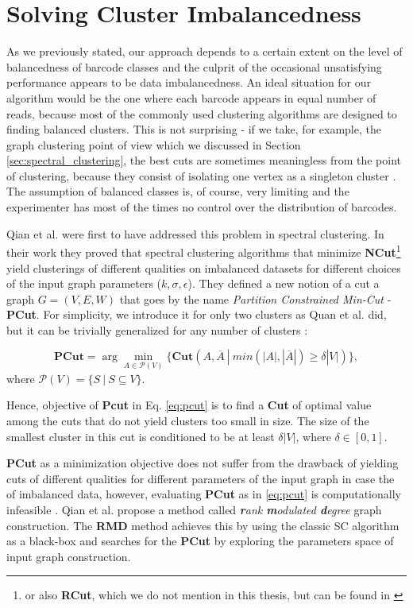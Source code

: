\section{Solving Cluster Imbalancedness}
As we previously stated, our approach depends to a certain extent on the level of balancedness of barcode classes and the culprit of the occasional unsatisfying performance appears to be data imbalancedness. An ideal situation for our algorithm would be the one where each barcode appears in equal number of reads, because most of the commonly used clustering algorithms are designed to finding balanced clusters. This is not surprising - if we take, for example, the graph clustering point of view which we discussed in Section \ref{sec:spectral_clustering}, the best cuts are sometimes meaningless from the point of clustering, because they consist of isolating one vertex as a singleton cluster \cite{von2007tutorial}. The assumption of balanced classes is, of course, very limiting and the experimenter has most of the times no control over the distribution of barcodes.

Qian et al. \cite{qian2013spectral} were first to have addressed this problem in spectral clustering. In their work they proved that spectral clustering algorithms that minimize \textbf{NCut}\footnote{or also \textbf{RCut}, which we do not mention in this thesis, but can be found in \cite{von2007tutorial}} yield clusterings of different qualities on imbalanced datasets for different choices of the input graph parameters ($k, \sigma, \epsilon$). They defined a new notion of a cut a graph $G = (V, E, W)$ that goes by the name \textit{Partition Constrained Min-Cut} - \textbf{PCut}. For simplicity, we introduce it for  only two clusters as Quan et al. did, but it can be trivially generalized for any number of clusters \cite{qian2013spectral}:

\begin{equation}
    \textbf{PCut} = \arg \min_{A \in \mathcal{P}(V)} \{
        \textbf{Cut}(A, \overline{A} ~|~ min(|A|, |\overline{A}|) \geq \delta |V| )
    \},
    \label{eq:pcut}
\end{equation}
where $\mathcal{P}(V) = \{S ~|~ S \subseteq V\}$.

Hence, objective of \textbf{Pcut} in Eq. \ref{eq:pcut} is to find a \textbf{Cut} of optimal value among the cuts that do not yield clusters too small in size. The size of the smallest cluster in this cut is conditioned to be at least $\delta |V|$, where $\delta \in [0 ,1]$.

\textbf{PCut} as a minimization objective does not suffer from the drawback of yielding cuts of different qualities for different parameters of the input graph in case the of imbalanced data, however, evaluating \textbf{PCut} as in \ref{eq:pcut} is computationally infeasible \cite{qian2013spectral}. Qian et al. propose a method called \textit{\textbf{r}ank \textbf{m}odulated \textbf{d}egree} graph construction. The \textbf{RMD} method achieves this by using the classic SC algorithm as a black-box and searches for the \textbf{PCut} by exploring the parameters space of input graph construction.

